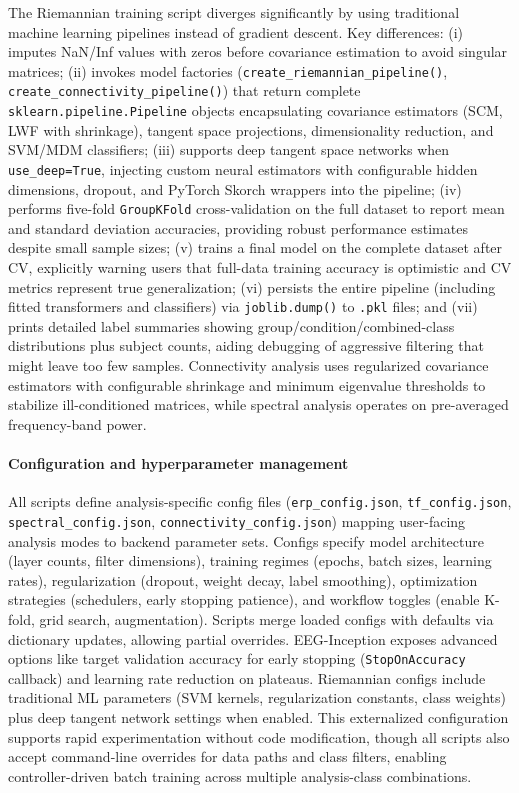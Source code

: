 \documentclass[12pt]{report}
\begin{document}
The Riemannian training script diverges significantly by using traditional machine learning pipelines instead of gradient descent. Key differences: (i) imputes NaN/Inf values with zeros before covariance estimation to avoid singular matrices; (ii) invokes model factories (\texttt{create\_riemannian\_pipeline()}, \texttt{create\_connectivity\_pipeline()}) that return complete \texttt{sklearn.pipeline.Pipeline} objects encapsulating covariance estimators (SCM, LWF with shrinkage), tangent space projections, dimensionality reduction, and SVM/MDM classifiers; (iii) supports deep tangent space networks when \texttt{use\_deep=True}, injecting custom neural estimators with configurable hidden dimensions, dropout, and PyTorch Skorch wrappers into the pipeline; (iv) performs five-fold \texttt{GroupKFold} cross-validation on the full dataset to report mean and standard deviation accuracies, providing robust performance estimates despite small sample sizes; (v) trains a final model on the complete dataset after CV, explicitly warning users that full-data training accuracy is optimistic and CV metrics represent true generalization; (vi) persists the entire pipeline (including fitted transformers and classifiers) via \texttt{joblib.dump()} to \texttt{.pkl} files; and (vii) prints detailed label summaries showing group/condition/combined-class distributions plus subject counts, aiding debugging of aggressive filtering that might leave too few samples. Connectivity analysis uses regularized covariance estimators with configurable shrinkage and minimum eigenvalue thresholds to stabilize ill-conditioned matrices, while spectral analysis operates on pre-averaged frequency-band power.

\paragraph{Configuration and hyperparameter management}\mbox{}

All scripts define analysis-specific config files (\texttt{erp\_config.json}, \texttt{tf\_config.json}, \texttt{spectral\_config.json}, \texttt{connectivity\_config.json}) mapping user-facing analysis modes to backend parameter sets. Configs specify model architecture (layer counts, filter dimensions), training regimes (epochs, batch sizes, learning rates), regularization (dropout, weight decay, label smoothing), optimization strategies (schedulers, early stopping patience), and workflow toggles (enable K-fold, grid search, augmentation). Scripts merge loaded configs with defaults via dictionary updates, allowing partial overrides. EEG-Inception exposes advanced options like target validation accuracy for early stopping (\texttt{StopOnAccuracy} callback) and learning rate reduction on plateaus. Riemannian configs include traditional ML parameters (SVM kernels, regularization constants, class weights) plus deep tangent network settings when enabled. This externalized configuration supports rapid experimentation without code modification, though all scripts also accept command-line overrides for data paths and class filters, enabling controller-driven batch training across multiple analysis-class combinations.
\end{document}
